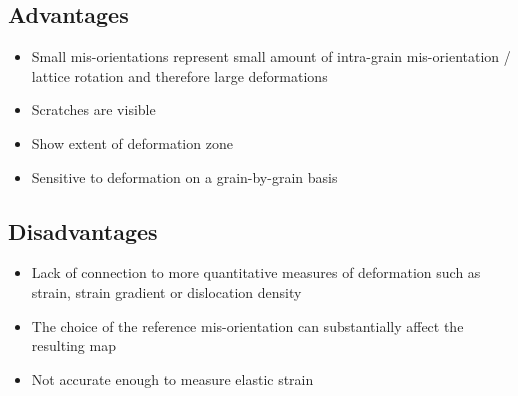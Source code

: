 \documentclass[letterpaper]{article}
\begin{document}
		\subsection{Advantages}
			\begin{itemize}
				\item Small mis-orientations represent small amount of intra-grain mis-orientation / lattice rotation and therefore large deformations \cite{Brewer2006}
				\item Scratches are visible \cite{Brewer2006}
				\item Show extent of deformation zone \cite{Brewer2006}
				\item Sensitive to deformation on a grain-by-grain basis \cite{Brewer2006}
			\end{itemize}
		
		\subsection{Disadvantages}
			\begin{itemize}
				\item Lack of connection to more quantitative measures of deformation such as strain, strain gradient or dislocation density \cite{Brewer2006}
				\item The choice of the reference mis-orientation can substantially affect the resulting map \cite{Brewer2006}
				\item Not accurate enough to measure elastic strain \cite{Brewer2006}
			\end{itemize}
	
\newpage
	
	
\end{document}
